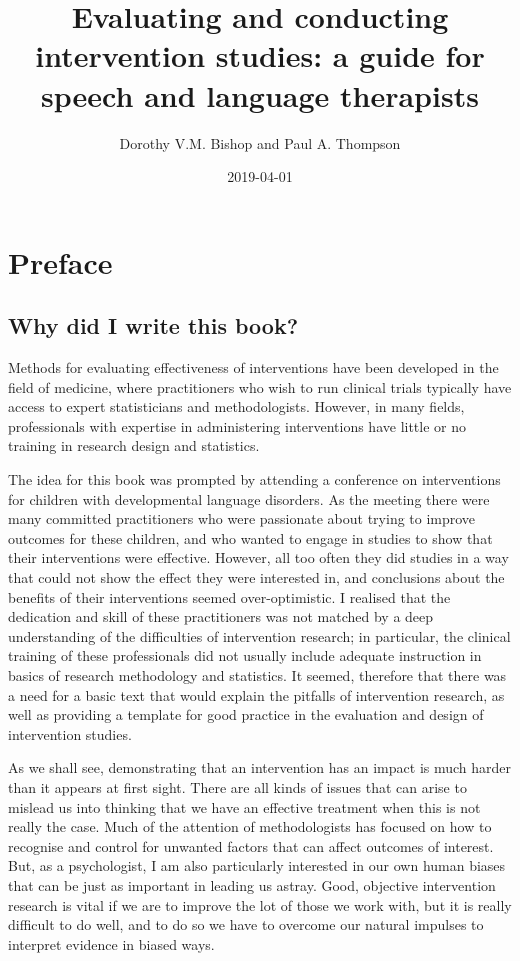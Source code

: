\documentclass[]{book}
\title{Evaluating and conducting intervention studies: a guide for speech and language therapists}
\author{Dorothy V.M. Bishop and Paul A. Thompson}
\date{2019-04-01}
\begin{document}
\maketitle

{
\setcounter{tocdepth}{1}
\tableofcontents
}
\hypertarget{preface}{%
\chapter*{Preface}\label{preface}}

\hypertarget{why-did-i-write-this-book}{%
\section*{Why did I write this book?}\label{why-did-i-write-this-book}}

Methods for evaluating effectiveness of interventions have been developed in the field of medicine, where practitioners who wish to run clinical trials typically have access to expert statisticians and methodologists. However, in many fields, professionals with expertise in administering interventions have little or no training in research design and statistics.

The idea for this book was prompted by attending a conference on interventions for children with developmental language disorders. As the meeting there were many committed practitioners who were passionate about trying to improve outcomes for these children, and who wanted to engage in studies to show that their interventions were effective. However, all too often they did studies in a way that could not show the effect they were interested in, and conclusions about the benefits of their interventions seemed over-optimistic. I realised that the dedication and skill of these practitioners was not matched by a deep understanding of the difficulties of intervention research; in particular, the clinical training of these professionals did not usually include adequate instruction in basics of research methodology and statistics. It seemed, therefore that there was a need for a basic text that would explain the pitfalls of intervention research, as well as providing a template for good practice in the evaluation and design of intervention studies.

As we shall see, demonstrating that an intervention has an impact is much harder than it appears at first sight. There are all kinds of issues that can arise to mislead us into thinking that we have an effective treatment when this is not really the case. Much of the attention of methodologists has focused on how to recognise and control for unwanted factors that can affect outcomes of interest. But, as a psychologist, I am also particularly interested in our own human biases that can be just as important in leading us astray. Good, objective intervention research is vital if we are to improve the lot of those we work with, but it is really difficult to do well, and to do so we have to overcome our natural impulses to interpret evidence in biased ways.
\end{document}
